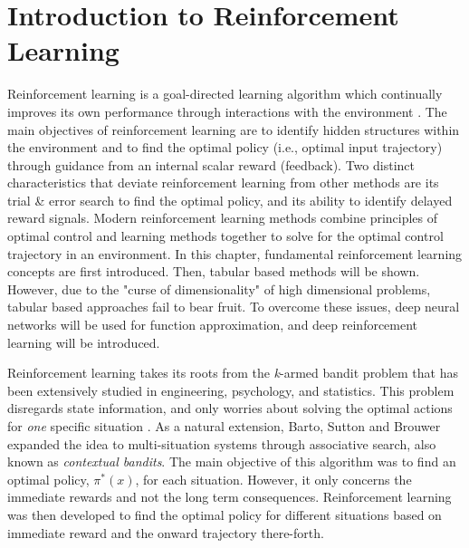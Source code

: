 %
%

\section{Introduction to Reinforcement Learning}

Reinforcement learning is a goal-directed learning algorithm which continually improves its own performance through interactions with the environment \cite{sutton}. The main objectives of reinforcement learning are to identify hidden structures within the environment and to find the optimal policy (i.e., optimal input trajectory) through guidance from an internal scalar reward (feedback). Two distinct characteristics that deviate reinforcement learning from other methods are its trial \& error search to find the optimal policy, and its ability to identify delayed reward signals. Modern reinforcement learning methods combine principles of optimal control and learning methods together to solve for the optimal control trajectory in an environment.  In this chapter, fundamental reinforcement learning concepts are first introduced.  Then, tabular based methods will be shown.  However, due to the "curse of dimensionality" of high dimensional problems, tabular based approaches fail to bear fruit.  To overcome these issues, deep neural networks will be used for function approximation, and deep reinforcement learning will be introduced.

Reinforcement learning takes its roots from the \textit{k}-armed bandit problem that has been extensively studied in engineering, psychology, and statistics.  This problem disregards state information, and only worries about solving the optimal actions for \textit{one} specific situation \cite{thompson1, thompson2, robbins, bellman_bandit}.  As a natural extension, Barto, Sutton and Brouwer expanded the idea to multi-situation systems \cite{bartosuttonbrouwer} through associative search, also known as \textit{contextual bandits}. The main objective of this algorithm was to find an optimal policy, $\pi^*(x)$, for each situation.  However, it only concerns the immediate rewards and not the long term consequences. Reinforcement learning was then developed to find the optimal policy for different situations based on immediate reward and the onward trajectory there-forth.  

